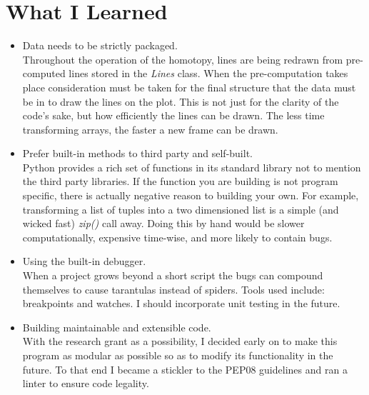 \documentclass{article}
\begin{document}
\section{What I Learned}
    \begin{itemize}
        \item Data needs to be strictly packaged.\\
            Throughout the operation of the homotopy, lines are being redrawn from pre-computed lines stored in the \textit{Lines} class. When the pre-computation takes place consideration must be taken for the final structure that the data must be in to draw the lines on the plot. This is not just for the clarity of the code's sake, but how efficiently the lines can be drawn. The less time transforming arrays, the faster a new frame can be drawn.
        \item Prefer built-in methods to third party and self-built.\\
            Python provides a rich set of functions in its standard library not to mention the third party libraries. If the function you are building is not program specific, there is actually negative reason to building your own. For example, transforming a list of tuples into a two dimensioned list is a simple (and wicked fast) \textit{zip()} call away. Doing this by hand would be slower computationally, expensive time-wise, and more likely to contain bugs.
        \item Using the built-in debugger.\\
            When a project grows beyond a short script the bugs can compound themselves to cause tarantulas instead of spiders. Tools used include: breakpoints and watches. I should incorporate unit testing in the future.
        \item Building maintainable and extensible code.\\
            With the research grant as a possibility, I decided early on to make this program as modular as possible so as to modify its functionality in the future. To that end I became a stickler to the PEP08 guidelines and ran a linter to ensure code legality.
    \end{itemize}
\end{document}
